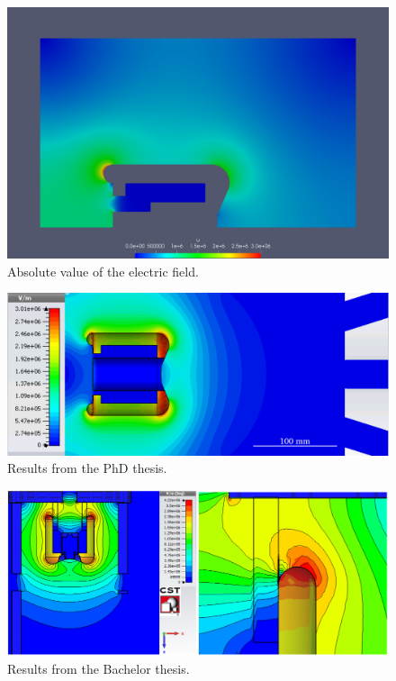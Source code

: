 \begin{center}
\begin{figure}[H]
  \includegraphics[width=\textwidth]{figures/60kV/gradient}
  \caption{Absolute value of the electric field.}
  \label{fig:electric_field}
\end{figure}
\end{center}

\begin{center}
\begin{figure}[H]
  \includegraphics[width=\textwidth]{figures/60kV/electric_field}
  \caption{Results from the PhD thesis.}
  \label{fig:phd_electric_field}
\end{figure}
\end{center}

\begin{center}
\begin{figure}[H]
  \includegraphics[width=\textwidth]{figures/60kV/electric_field_wende}
  \caption{Results from the Bachelor thesis.}
  \label{fig:electric_field_wende}
\end{figure}
\end{center}

